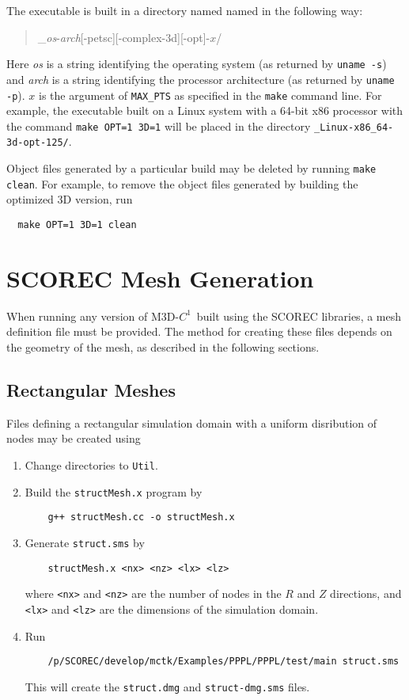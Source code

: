 \documentclass[letterpaper]{book}
\newcommand{\codename}{\textsc{M3D-$C^1$}}
\begin{document}
The executable is built in a directory named named in the following way:
\begin{quote}
  \_\textit{os}-\textit{arch}[-petsc][-complex\textbar-3d][-opt]-$x$/
\end{quote}
Here \textit{os} is a string identifying the operating system (as
returned by \texttt{uname -s}) and \textit{arch} is a string
identifying the processor architecture (as returned by \texttt{uname
  -p}).  $x$ is the argument of \texttt{MAX\_PTS} as specified in the
\texttt{make} command line.  For example, the executable built on a
Linux system with a 64-bit x86 processor with the command
\texttt{make OPT=1 3D=1} will be placed in the
directory \texttt{\_Linux-x86\_64-3d-opt-125/}.

Object files generated by a particular build may be deleted by running
\texttt{make clean}.  For example, to remove the object files
generated by building the optimized 3D version, run
\begin{verbatim}
  make OPT=1 3D=1 clean
\end{verbatim}


\section{SCOREC Mesh Generation}
\label{sec:mesh_generation}

When running any version of \codename\ built using the SCOREC
libraries, a mesh definition file must be provided.  The method for
creating these files depends on the geometry of the mesh, as described
in the following sections.

\subsection{Rectangular Meshes}

Files defining a rectangular simulation domain with a uniform
disribution of nodes may be created using
\begin{enumerate}
\item Change directories to \texttt{Util}.
\item Build the \texttt{structMesh.x} program by 
  \begin{verbatim}
    g++ structMesh.cc -o structMesh.x
  \end{verbatim}
\item Generate \texttt{struct.sms} by
  \begin{verbatim}
    structMesh.x <nx> <nz> <lx> <lz>
  \end{verbatim}
  where \texttt{<nx>} and \texttt{<nz>} are the number of nodes in the
  $R$ and $Z$ directions, and \texttt{<lx>} and \texttt{<lz>} are the
  dimensions of the simulation domain.
\item Run 
  \begin{verbatim}
    /p/SCOREC/develop/mctk/Examples/PPPL/PPPL/test/main struct.sms
  \end{verbatim} 
  This will create the \texttt{struct.dmg} and \texttt{struct-dmg.sms}
  files.
\end{enumerate}
\end{document}
